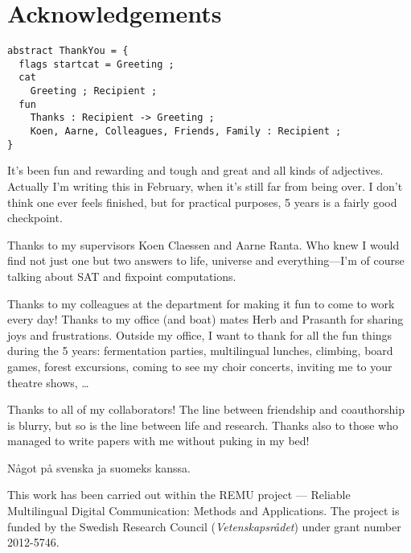 \chapter*{Acknowledgements}\label{chp:acknowledgements}


\begin{verbatim}
abstract ThankYou = {
  flags startcat = Greeting ;
  cat 
    Greeting ; Recipient ;
  fun
    Thanks : Recipient -> Greeting ;
    Koen, Aarne, Colleagues, Friends, Family : Recipient ;
}
\end{verbatim}


It's been fun and rewarding and tough and great and all kinds of adjectives. Actually I'm writing this in February, when it's still far from being over.
I don't think one ever feels finished, but for practical purposes, 5 years is a fairly good checkpoint.

Thanks to my supervisors Koen Claessen and Aarne Ranta. Who knew I would find not just one but two answers to life, universe and everything---I'm of course talking about SAT and fixpoint computations.

Thanks to my colleagues at the department for making it fun to come to work every day! Thanks to my office (and boat) mates Herb and Prasanth for sharing joys and frustrations. Outside my office, I want to thank  for all the fun things during the 5 years: fermentation parties, multilingual lunches, climbing, board games, forest excursions, coming to see my choir concerts, inviting me to your theatre shows, \dots

Thanks to all of my collaborators! The line between friendship and coauthorship is blurry, but so is the line between life and research. Thanks also to those who managed to write papers with me without puking in my bed!

Något på svenska ja suomeks kanssa.


















\vfill\noindent
This work has been carried out within the REMU project — Reliable Multilingual Digital Communication: Methods and Applications.
The project is funded by the Swedish Research Council (\emph{Vetenskapsrådet}) under grant number 2012-5746.
